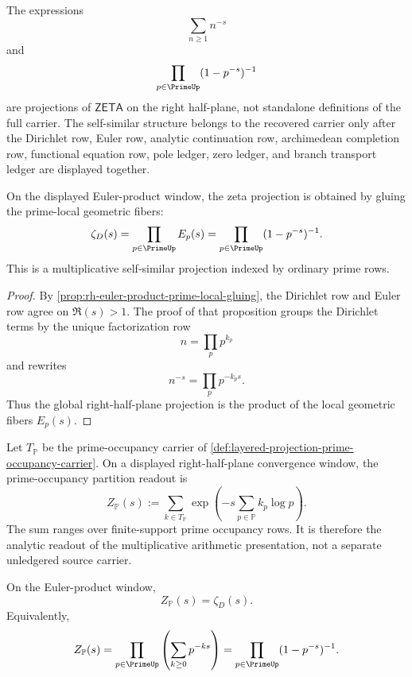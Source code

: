 \begin{principle}
\label{prin:rh-zeta-self-similarity-carrier-level}
The expressions
$$
\sum_{n\geq1}n^{-s}
$$
and
$$
\prod_{p\in\PrimeUp}(1-p^{-s})^{-1}
$$
are projections of $\mathsf{ZETA}$ on the right half-plane, not
standalone definitions of the full carrier. The self-similar structure
belongs to the recovered carrier only after the Dirichlet row, Euler
row, analytic continuation row, archimedean completion row, functional
equation row, pole ledger, zero ledger, and branch transport ledger are
displayed together.
\end{principle}

\begin{proposition}
\label{prop:rh-euler-gluing-multiplicative-self-similarity}
On the displayed Euler-product window, the zeta projection is obtained
by gluing the prime-local geometric fibers:
$$
\zeta_D(s)
=
\prod_{p\in\PrimeUp}E_p(s)
=
\prod_{p\in\PrimeUp}(1-p^{-s})^{-1}.
$$
This is a multiplicative self-similar projection indexed by ordinary
prime rows.
\end{proposition}

\begin{proof}
By \autoref{prop:rh-euler-product-prime-local-gluing}, the Dirichlet row
and Euler row agree on $\Re(s)>1$. The proof of that proposition groups
the Dirichlet terms by the unique factorization row
$$
n=\prod_p p^{k_p}
$$
and rewrites
$$
n^{-s}=\prod_p p^{-k_ps}.
$$
Thus the global right-half-plane projection is the product of the local
geometric fibers $E_p(s)$.
\end{proof}

\begin{definition}
\label{def:rh-prime-occupancy-partition-readout}
Let $T_{\mathbb P}$ be the prime-occupancy carrier of
\autoref{def:layered-projection-prime-occupancy-carrier}. On a displayed
right-half-plane convergence window, the prime-occupancy partition
readout is
$$
Z_{\mathbb P}(s)
:=
\sum_{k\in T_{\mathbb P}}
\exp\left(
-s\sum_{p\in\mathbb P}k_p\log p
\right).
$$
The sum ranges over finite-support prime occupancy rows. It is therefore
the analytic readout of the multiplicative arithmetic presentation, not
a separate unledgered source carrier.
\end{definition}

\begin{proposition}
\label{prop:rh-zeta-prime-occupancy-partition-readout}
On the Euler-product window,
$$
Z_{\mathbb P}(s)=\zeta_D(s).
$$
Equivalently,
$$
Z_{\mathbb P}(s)
=
\prod_{p\in\PrimeUp}
\left(\sum_{k\geq0}p^{-ks}\right)
=
\prod_{p\in\PrimeUp}(1-p^{-s})^{-1}.
$$
\end{proposition}

